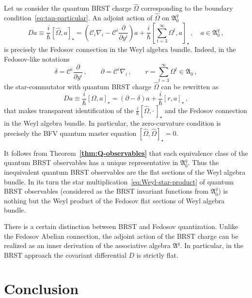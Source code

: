 \documentclass[a4paper,11pt,oneside]{amsart}
\theoremstyle{plain}
\numberwithin{equation}{section} %
\numberwithin{figure}{section} %
\newcommand{\bref}[1]{{\bf \ref{#1}}}
\newcommand{\qcommut}[2]{[#1,#2]_\star}
\def\d{\partial}
\newcommand{\dl}[1]{\displaystyle\frac{{\d}}{\d #1}}
\def\cc{{\mathcal C}}
\def\aA{{ \mathfrak A}}
\begin{document}
\noindent
Let us consider the quantum BRST charge $\hat\Omega$
corresponding to the boundary condition~\eqref{eq:tau-particular}.  An
adjoint action of $\hat\Omega$ on $\aA^q_0$
\begin{equation}
Da \equiv \frac{i}{\hbar}\qcommut{\hat\Omega}{a}=
(\cc_i\nabla_i-\cc^i\dl{y^i})a+\frac{i}{\hbar}
\qcommut{\sum^\infty_{t=3} \Omega^t}{a}\,,
\quad a\in\aA^q_0\,,
\end{equation}
is precisely the Fedosov connection in the Weyl algebra
bundle.  Indeed, in the Fedosov-like notations
\begin{equation}
  \label{eq:fedosov}
  \delta=\cc^i\dl{y^i}\,,\qquad
  \partial=\cc^i \nabla_i\,,\qquad
  r=\sum_{t=3}^\infty \Omega^t \in \aA_0\,,
\end{equation}
the star-commutator with quantum BRST charge $\hat\Omega$
can be rewritten as
\begin{equation}
Da \equiv \frac{i}{\hbar}\qcommut{\Omega}{a}=
(\partial-\delta)a+\frac{i}{\hbar}\qcommut{r}{a}\,,
\end{equation}
that makes transparent identification of the
$\frac{i}{\hbar}\qcommut{\hat\Omega}{\cdot\,}$ and the
Fedosov connection in the Weyl algebra bundle.  In
particular, the zero-curvature condition is precisely
the BFV quantum master equation
$\qcommut{\hat\Omega}{\hat\Omega}=0$.

\noindent
It follows from Theorem~\bref{thm:Q-observables} that
each equivalence class of the quantum BRST observables has
a unique representative in $\aA^q_0$.  Thus the inequivalent
quantum BRST observables are the flat sections of the
Weyl algebra bundle.  In its turn the star
multiplication~\eqref{eq:Weyl-star-product} of quantum
BRST observables (considered as the BRST invariant
functions from $\aA_0^q$) is nothing but the Weyl
product of the Fedosov flat sections of Weyl algebra bundle.

\noindent
There is a certain distinction between BRST and Fedosov
quantization.  Unlike the Fedosov Abelian connection,
the adjoint action of the BRST charge can be realized
as an inner derivation of the associative algebra
$\aA^q$.  In particular, in the BRST approach the
covariant differential $D$ is strictly flat.

\section{Conclusion}
\end{document}
